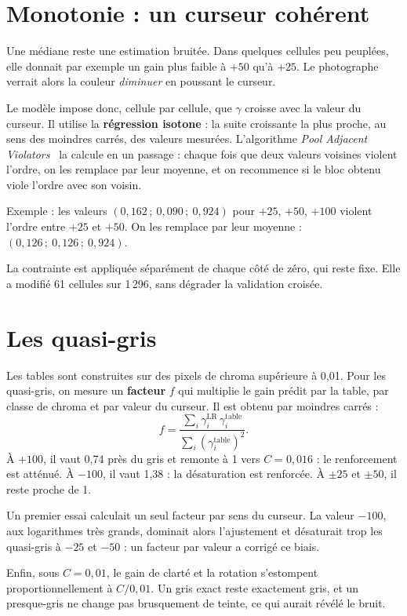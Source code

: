 \section{Monotonie : un curseur cohérent}
Une médiane reste une estimation bruitée. Dans quelques cellules peu
peuplées, elle donnait par exemple un gain plus faible à $+50$ qu'à $+25$. Le
photographe verrait alors la couleur \emph{diminuer} en poussant le curseur.

Le modèle impose donc, cellule par cellule, que $\gamma$ croisse avec la
valeur du curseur. Il utilise la \textbf{régression isotone} : la suite
croissante la plus proche, au sens des moindres carrés, des valeurs mesurées.
L'algorithme \emph{Pool Adjacent Violators}~\cite{ayer1955} la calcule en un
passage : chaque fois que deux valeurs voisines violent l'ordre, on les
remplace par leur moyenne, et on recommence si le bloc obtenu viole l'ordre
avec son voisin.

Exemple : les valeurs $(0{,}162\,;\ 0{,}090\,;\ 0{,}924)$ pour $+25$, $+50$,
$+100$ violent l'ordre entre $+25$ et $+50$. On les remplace par leur moyenne :
$(0{,}126\,;\ 0{,}126\,;\ 0{,}924)$.

La contrainte est appliquée séparément de chaque côté de zéro, qui reste fixe.
Elle a modifié 61 cellules sur 1\,296, sans dégrader la validation croisée.

\section{Les quasi-gris}
Les tables sont construites sur des pixels de chroma supérieure à 0,01. Pour
les quasi-gris, on mesure un \textbf{facteur} $f$ qui multiplie le gain prédit
par la table, par classe de chroma et par valeur du curseur. Il est obtenu par
moindres carrés :
\begin{equation}
f=\frac{\sum_i \gamma_i^{\text{LR}}\,\gamma_i^{\text{table}}}{\sum_i \left(\gamma_i^{\text{table}}\right)^2}.
\end{equation}
À $+100$, il vaut 0,74 près du gris et remonte à 1 vers $C=0{,}016$ : le
renforcement est atténué. À $-100$, il vaut 1,38 : la désaturation est
renforcée. À $\pm25$ et $\pm50$, il reste proche de 1.

Un premier essai calculait un seul facteur par sens du curseur. La valeur
$-100$, aux logarithmes très grands, dominait alors l'ajustement et
désaturait trop les quasi-gris à $-25$ et $-50$ : un facteur par valeur a
corrigé ce biais.

Enfin, sous $C=0{,}01$, le gain de clarté et la rotation s'estompent
proportionnellement à $C/0{,}01$. Un gris exact reste exactement gris, et un
presque-gris ne change pas brusquement de teinte, ce qui aurait révélé le
bruit.

